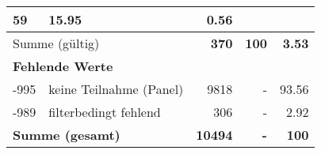 \begin{longtable}{lXrrr}
       \num{59} &
       \num[round-mode=places,round-precision=2]{15,95} &
         \num[round-mode=places,round-precision=2]{0,56} \\
     \midrule
     \multicolumn{2}{l}{Summe (gültig)} &
       \textbf{\num{370}} &
     \textbf{100} &
       \textbf{\num[round-mode=places,round-precision=2]{3,53}} \\
     \multicolumn{5}{l}{\textbf{Fehlende Werte}}\\
       -995 &
       keine Teilnahme (Panel) &
         \num{9818} &
        - &
         \num[round-mode=places,round-precision=2]{93,56} \\
       -989 &
       filterbedingt fehlend &
         \num{306} &
        - &
         \num[round-mode=places,round-precision=2]{2,92} \\
     \midrule
     \multicolumn{2}{l}{\textbf{Summe (gesamt)}} &
          \textbf{\num{10494}} &
        \textbf{-} &
        \textbf{100} \\
     \bottomrule
     \end{longtable}
     
